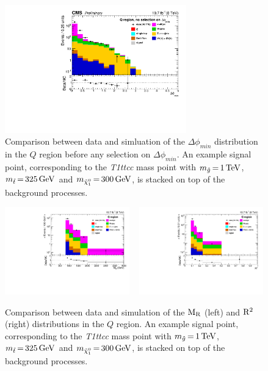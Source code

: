 \begin{figure}[htbp]
\centering
\includegraphics[width=0.7\textwidth]{figures/razor_selection/DataMC_minDeltaPhi_0Lbg1uW0Ll_rebin}
\caption{Comparison between data and simluation of the $\Delta\phi_{min}$ distribution in the $Q$
region before any selection on $\Delta\phi_{min}$. An example signal
point, corresponding to the {\it T1ttcc} mass point with $m_{\tilde{g}} \,{=}\, 1\,\text{Te\hspace{-.08em}V}$,
$m_{\tilde{t}} \,{=}\, 325\,\text{Ge\hspace{-.08em}V}$ and $m_{\tilde{\chi}_1^0} \,{=}\, 300\,\text{Ge\hspace{-.08em}V}$, is stacked on top of
the
background processes.
\label{fig:boost_Q_region_mindeltaphi}}
\end{figure}

\begin{figure}[htbp]
\centering
\includegraphics[width=0.48\textwidth]
{figures/razor_selection/plots/DataMC_MR_0Lbg1uW0Ll_mdPhi0p3_width}
~
\includegraphics[width=0.48\textwidth]
{figures/razor_selection/plots/DataMC_R2_0Lbg1uW0Ll_mdPhi0p3_width}
\caption{Comparison between data and simulation of the $\mathrm{M_R}$ (left) and $\mathrm{R^2}$ (right)
distributions in the $Q$ region. An example signal
point, corresponding to the {\it T1ttcc} mass point with $m_{\tilde{g}} \,{=}\, 1\,\text{Te\hspace{-.08em}V}$,
$m_{\tilde{t}} \,{=}\, 325\,\text{Ge\hspace{-.08em}V}$ and $m_{\tilde{\chi}_1^0} \,{=}\, 300\,\text{Ge\hspace{-.08em}V}$, is stacked on top of
the
background processes.
\label{fig:boost_Q_region_MR_Rsq}}
\end{figure}

